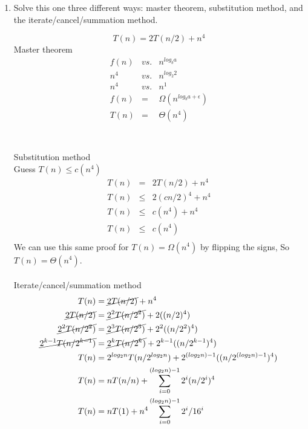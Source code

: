 \documentclass{article}
\begin{document}
    \begin{enumerate}
    \item
    
      Solve this one three different ways:  master theorem,
      substitution method, and the iterate/cancel/summation method.
    
      \[T(n) = 2T(n/2) + n^4\]
      Master theorem \\
      \begin{eqnarray*}
      f(n) &vs.& n^{log_b a} \\
      n^4 &vs.& n^{log_2 2} \\
      n^4 &vs.& n^1 \\
      f(n) &=& \Omega(n^{log_b a+\epsilon}) \\
      T(n) &=& \Theta(n^4) \\
      \end{eqnarray*}
      \\
      \\
      Substitution method \\
      Guess $T(n) \leq c(n^4)$ \\
      \begin{eqnarray*}
      T(n) &=& 2T(n/2) + n^4 \\
      T(n) &\leq& 2(cn/2)^4 + n^4 \\      
      T(n) &\leq& c(n^4) + n^4 \\
      T(n) &\leq& c(n^4) \\
      \end{eqnarray*}
      We can use this same proof for $T(n) = \Omega(n^4)$ by flipping the signs, So $T(n) = \Theta(n^4)$.
\\
\\
      Iterate/cancel/summation method \\

      \begin{align*}
      T(n) &=  \cancel{2T(n/2)} + n^4 \\
      \cancel{2T(n/2)} &=  \cancel{2^2T(n/2^2)} + 2((n/2)^4) \\
      \cancel{2^2T(n/2^2)} &=  \cancel{2^3T(n/2^3)} + 2^2((n/2^2)^4) \\
      \cancel{2^{k-1}T(n/2^{k-1})} &=  \cancel{2^kT(n/2^k)} + 2^{k-1}((n/2^{k-1})^4) \\
      T(n) &= 2^{log_2 n} T(n/2^{log_2 n}) + 2^{(log_2 n) -1}((n/2^{{(log_2 n) -1}})^4) \\
      T(n) &= n T(n/n) + \sum_{i=0}^{(log_2 n)-1}  2^i(n/2^i)^4 \\
      T(n) &= n T(1) + n^4 \sum_{i=0}^{(log_2 n)-1}  2^i/16^i \\
      \end{align*}



\end{enumerate}
\end{document}
